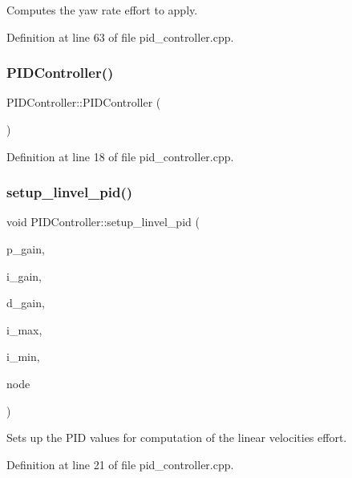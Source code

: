 Computes the yaw rate effort to apply. 



Definition at line 63 of file pid\+\_\+controller.\+cpp.

\mbox{\label{group__test__utils_ga67cc314aa5b3b4e9c47ac414b3a4c008}} 
\subsubsection{\texorpdfstring{PIDController()}{PIDController()}}
{\footnotesize\ttfamily P\+I\+D\+Controller\+::\+P\+I\+D\+Controller (\begin{DoxyParamCaption}{ }\end{DoxyParamCaption})}



Definition at line 18 of file pid\+\_\+controller.\+cpp.

\mbox{\label{group__test__utils_ga845b866b1ae4b73e39e4ca42395750b3}} 
\subsubsection{\texorpdfstring{setup\_linvel\_pid()}{setup\_linvel\_pid()}}
{\footnotesize\ttfamily void P\+I\+D\+Controller\+::setup\+\_\+linvel\+\_\+pid (\begin{DoxyParamCaption}\item[{double}]{p\+\_\+gain,  }\item[{double}]{i\+\_\+gain,  }\item[{double}]{d\+\_\+gain,  }\item[{double}]{i\+\_\+max,  }\item[{double}]{i\+\_\+min,  }\item[{const ros\+::\+Node\+Handle \&}]{node }\end{DoxyParamCaption})}



Sets up the P\+ID values for computation of the linear velocities effort. 



Definition at line 21 of file pid\+\_\+controller.\+cpp.

